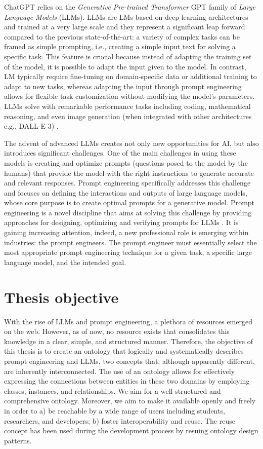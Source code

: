 ChatGPT relies on the \textit{Generative Pre-trained Transformer} GPT family of \textit{Large Language Models} (LLMs).
LLMs are LMs based on deep learning architectures and trained at a very large scale and they represent a significant leap forward compared to the previous state-of-the-art: a variety of complex tasks can be framed as simple prompting, i.e., creating a simple input text for solving a specific task. This feature is crucial because instead of adapting the training set of the model, it is possible to adapt the input given to the model.
In contrast, LM  typically require fine-tuning on domain-specific data or additional training to adapt to new tasks, whereas adapting the input through prompt engineering allows for flexible task customization without modifying the model's parameters.
LLMs solve with remarkable performance tasks including coding, mathematical reasoning, and even image generation (when integrated with other architectures e.g., DALL-E 3) \cite{ref3}.



The advent of advanced LLMs creates not only new opportunities for AI, but also introduces significant challenges.
One of the main challenges in using these models is creating and optimize prompts (questions posed to the model by the humans) \cite{ref5} that provide the model with the right instructions to generate accurate and relevant responses. Prompt engineering specifically addresses this challenge and focuses on defining the interactions and outputs of large language models, whose core purpose is to create optimal prompts for a generative model\cite{amatriain2024prompt}.
Prompt engineering is a novel discipline that aims at solving this challenge by providing approaches for designing, optimizing and verifying prompts for LLMs \cite{amatriain2024prompt}.
It is gaining increasing attention, indeed, a new professional role is emerging within industries: the prompt engineers. The prompt engineer must essentially select the most appropriate prompt engineering technique for a given task, a specific large language model, and the intended goal.
\section{Thesis objective}
With the rise of LLMs and prompt engineering, a plethora of resources emerged on the web.
However, as of now, no resource exists that consolidates this knowledge in a clear, simple, and structured manner.
Therefore, the objective of this thesis is to create 
an ontology that logically and systematically describes prompt engineering and LLMs, two concepts that, although apparently different, are inherently interconnected.
The use of an ontology allows for effectively expressing the connections between entities in these two domains by employing classes, instances, and relationships.
We aim for a well-structured and comprehensive ontology.
Moreover, we aim to make it available openly and freely in order to a) be reachable by a wide range of users including students, researchers, and developers; b) foster interoperability and reuse. The reuse concept has been used during the development process by resuing ontology design patterns. 

